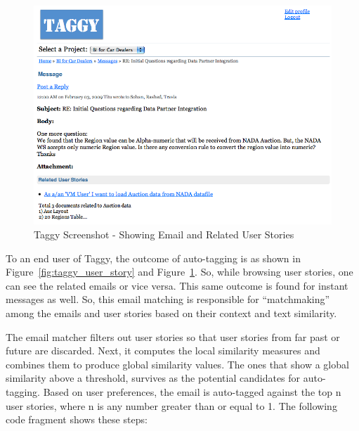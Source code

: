 \begin{figure}[tb]
	\centering
	\includegraphics[width=\textwidth]{taggy_email.png}
    \caption{Taggy Screenshot - Showing Email and Related User Stories}
	\label{fig:taggy_email}
\end{figure}



To an end user of Taggy, the outcome of auto-tagging is as shown in Figure~\ref{fig:taggy_user_story} and Figure~\ref{fig:taggy_email}. So, while browsing user stories, one can see the related emails or vice versa. This same outcome is found for instant messages as well. So, this email matching is responsible for ``matchmaking'' among the emails and user stories based on their context and text similarity.

The email matcher filters out user stories so that user stories from far past or future are discarded. Next, it computes the local similarity measures and combines them  to produce global similarity values. The ones that show a global similarity above a threshold, survives as the potential candidates for auto-tagging. Based on user preferences, the email is auto-tagged against the top n user stories, where n is any number greater than or equal to 1. The following code fragment shows these steps:

